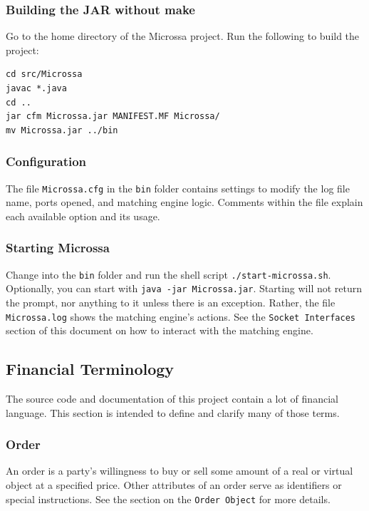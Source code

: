 \documentclass[Letter]{article}
\begin{document}
\subsubsection{Building the JAR without make}

Go to the home directory of the Microssa project.  Run the following to
build the project:
\begin{verbatim}
cd src/Microssa
javac *.java
cd ..
jar cfm Microssa.jar MANIFEST.MF Microssa/
mv Microssa.jar ../bin
\end{verbatim}

\subsubsection{Configuration}
The file \texttt{Microssa.cfg} in the \texttt{bin} folder contains
settings to modify the log file name, ports opened, and matching engine
logic.  Comments within the file explain each available option and
its usage.

\subsubsection{Starting Microssa}

Change into the \texttt{bin} folder and run the shell script
\texttt{./start-microssa.sh}.  Optionally, you can start with
\texttt{java -jar Microssa.jar}.  Starting will not return the prompt, nor
anything to it unless there is an exception. Rather, the file
\texttt{Microssa.log} shows the matching engine's actions.  See the
\texttt{Socket Interfaces} section of this document on how to interact
with the matching engine.

\subsection{Financial Terminology}

The source code and documentation of this project contain a lot
of financial language.  This section is intended to define and clarify
many of those terms.

\subsubsection{Order}

An order is a party's willingness to buy or sell some amount of a
real or virtual object at a specified price.  Other attributes of an
order serve as identifiers or special instructions.  See the section
on the \texttt{Order Object} for more details.
\end{document}
